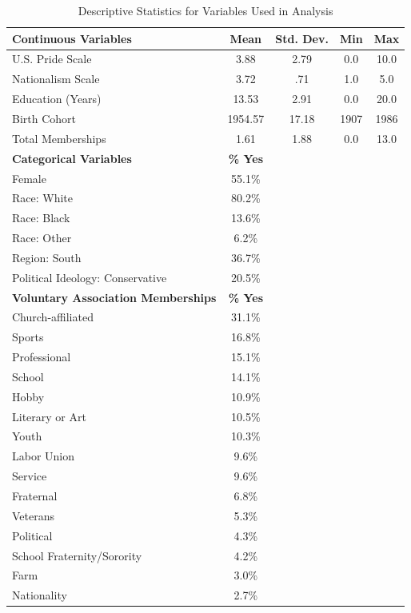 \begin{table}[htbp]
\centering
\caption{Descriptive Statistics for Variables Used in Analysis}
\label{tab:descriptives}
\begin{tabular}{lcccc}
\toprule
\textbf{Continuous Variables} & \textbf{Mean} & \textbf{Std. Dev.} & \textbf{Min} & \textbf{Max} \\
\midrule
U.S. Pride Scale & 3.88 & 2.79 & 0.0 & 10.0 \\
Nationalism Scale & 3.72 & .71 & 1.0 & 5.0 \\
Education (Years) & 13.53 & 2.91 & 0.0 & 20.0 \\
Birth Cohort & 1954.57 & 17.18 & 1907 & 1986 \\
Total Memberships & 1.61 & 1.88 & 0.0 & 13.0 \\
\midrule
\textbf{Categorical Variables} & \textbf{\% Yes} & & & \\
\midrule
Female & 55.1\% & & & \\
Race: White & 80.2\% & & & \\
Race: Black & 13.6\% & & & \\
Race: Other & 6.2\% & & & \\
Region: South & 36.7\% & & & \\
Political Ideology: Conservative & 20.5\% & & & \\
\midrule
\textbf{Voluntary Association Memberships} & \textbf{\% Yes} & & & \\
\midrule
Church-affiliated & 31.1\% & & & \\
Sports & 16.8\% & & & \\
Professional & 15.1\% & & & \\
School & 14.1\% & & & \\
Hobby & 10.9\% & & & \\
Literary or Art & 10.5\% & & & \\
Youth & 10.3\% & & & \\
Labor Union & 9.6\% & & & \\
Service & 9.6\% & & & \\
Fraternal & 6.8\% & & & \\
Veterans & 5.3\% & & & \\
Political & 4.3\% & & & \\
School Fraternity/Sorority & 4.2\% & & & \\
Farm & 3.0\% & & & \\
Nationality & 2.7\% & & & \\
\bottomrule
\end{tabular}
\end{table}
